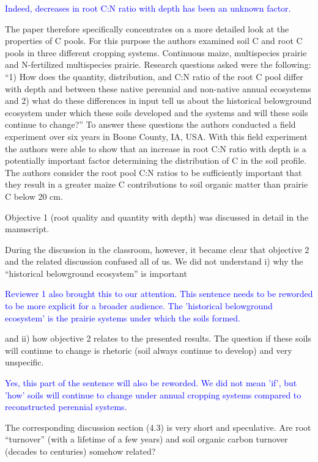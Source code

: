 \documentclass[]{article}
\begin{document}
\textcolor{blue}{Indeed, decreases in root C:N ratio with depth has been an unknown factor.}

The paper therefore specifically concentrates on a more detailed look at
the properties of C pools. For this purpose the authors examined soil C
and root C pools in three different cropping systems. Continuous maize,
multispecies prairie and N-fertilized multispecies prairie. Research
questions asked were the following: ``1) How does the quantity,
distribution, and C:N ratio of the root C pool differ with depth and
between these native perennial and non-native annual ecosystems and 2)
what do these differences in input tell us about the historical
belowground ecosystem under which these soils developed and the systems
and will these soils continue to change?'' To answer these questions the
authors conducted a field experiment over six years in Boone County, IA,
USA. With this field experiment the authors were able to show that an
increase in root C:N ratio with depth is a potentially important factor
determining the distribution of C in the soil profile. The authors
consider the root pool C:N ratios to be sufficiently important that they
result in a greater maize C contributions to soil organic matter than
prairie C below 20 cm.

Objective 1 (root quality and quantity with depth) was discussed in
detail in the manuscript.

During the discussion in the classroom, however, it became clear that
objective 2 and the related discussion confused all of us. We did not
understand i) why the ``historical belowground ecosystem'' is important

\textcolor{blue}{Reviewer 1 also brought this to our attention. This sentence needs to be reworded to be more explicit for a broader audience. The 'historical belowground ecosystem' is the prairie systems under which the soils formed.}

and ii) how objective 2 relates to the presented results. The question
if these soils will continue to change is rhetoric (soil always continue
to develop) and very unspecific.

\textcolor{blue}{Yes, this part of the sentence will also be reworded. We did not mean 'if', but 'how' soils will continue to change under annual cropping systems compared to reconstructed perennial systems.}

The corresponding discussion section (4.3) is very short and
speculative. Are root ``turnover'' (with a lifetime of a few years) and
soil organic carbon turnover (decades to centuries) somehow related?
\end{document}
